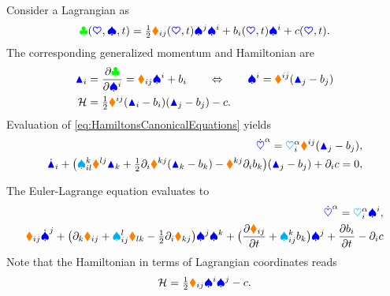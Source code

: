 \begin{Example}
Consider a Lagrangian as
\begin{align}
 \Lagrangian(\sysCoord, \sysVel, t) = \tfrac{1}{2} \sysInertiaMatCoeff{\LidxI\LidxII}(\sysCoord, t) \sysVelCoeff{\LidxII}\sysVelCoeff{\LidxI} + b_\LidxI(\sysCoord, t) \sysVelCoeff{\LidxI} + c(\sysCoord, t).
\end{align}
The corresponding generalized momentum and Hamiltonian are
\begin{align}
 \genMomentumCoeff{\LidxI} &= \pdiff[\Lagrangian]{\sysVelCoeff{\LidxI}} = \sysInertiaMatCoeff{\LidxI\LidxII}  \sysVelCoeff{\LidxI} + b_\LidxI
\qquad \Leftrightarrow \qquad 
 \sysVelCoeff{\LidxI} = \isysInertiaMatCoeff{\LidxI\LidxII} (\genMomentumCoeff{\LidxII} - b_\LidxII)
\\
 \Hamiltonian &= \tfrac{1}{2} \isysInertiaMatCoeff{\LidxI\LidxII} (\genMomentumCoeff{\LidxI} - b_\LidxI)(\genMomentumCoeff{\LidxII} - b_\LidxII) - c.
\end{align}
Evaluation of \eqref{eq:HamiltonsCanonicalEquations} yields
\begin{subequations}
\begin{align}
 \sysCoordCoeffd{\GidxI} = \kinMatCoeff{\GidxI}{\LidxI} \isysInertiaMatCoeff{\LidxI\LidxII} (\genMomentumCoeff{\LidxII} - b_\LidxII), 
\\
 \genMomentumCoeffd{\LidxI}
 + \big( \BoltzSym{\LidxIII}{\LidxI}{\LidxIV} \isysInertiaMatCoeff{\LidxIV\LidxII} \genMomentumCoeff{\LidxIII}
 + \tfrac{1}{2} \dirDiff{\LidxI}\isysInertiaMatCoeff{\LidxIII\LidxII} (\genMomentumCoeff{\LidxIII} - b_\LidxIII)
 - \isysInertiaMatCoeff{\LidxIII\LidxII} \dirDiff{\LidxI} b_\LidxIII \big)(\genMomentumCoeff{\LidxII} - b_\LidxII)
 + \dirDiff{\LidxI} c = 0, 
\end{align}
\end{subequations}

The Euler-Lagrange equation evaluates to
\begin{subequations}
\begin{align}
 \sysCoordCoeffd{\GidxI} = \kinMatCoeff{\GidxI}{\LidxI} \sysVelCoeff{\LidxI}, 
\\
 \sysInertiaMatCoeff{\LidxI\LidxII} \sysVelCoeffd{\LidxII}
 + \big( \dirDiff{\LidxIII}\sysInertiaMatCoeff{\LidxI\LidxII}
 + \BoltzSym{\LidxIV}{\LidxI}{\LidxII} \sysInertiaMatCoeff{\LidxIV\LidxIII}
 - \tfrac{1}{2} \dirDiff{\LidxI}\sysInertiaMatCoeff{\LidxIII\LidxII} \big) \sysVelCoeff{\LidxII}\sysVelCoeff{\LidxIII}
 + \big( \pdiff[\sysInertiaMatCoeff{\LidxI\LidxII}]{t} + \BoltzSym{\LidxIII}{\LidxI}{\LidxII} b_\LidxIII \big) \sysVelCoeff{\LidxII}
 + \pdiff[b_\LidxI]{t}
 - \dirDiff{\LidxI} c
\end{align}
\end{subequations}
Note that the Hamiltonian in terms of Lagrangian coordinates reads
\begin{align}
 \Hamiltonian = \tfrac{1}{2} \sysInertiaMatCoeff{\LidxI\LidxII} \sysVelCoeff{\LidxI} \sysVelCoeff{\LidxII} - c.
\end{align}


\end{Example}
